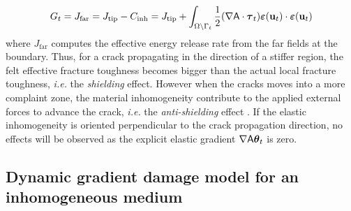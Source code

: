 \[
G_t=J_\mathrm{far}=J_\mathrm{tip}-C_\mathrm{inh}=J_\mathrm{tip}+\int_\domaint\frac{1}{2}(\nabla\tens{A}\cdot\vtau_t)\eps(\vec{u}_t)\cdot\eps(\vec{u}_t)
\]
where $J_\mathrm{far}$ computes the effective energy release rate from the far fields at the boundary. Thus, for a crack propagating in the direction of a stiffer region, the felt effective fracture toughness becomes bigger than the actual local fracture toughness, \emph{i.e.} the \emph{shielding} effect. However when the cracks moves into a more complaint zone, the material inhomogeneity contribute to the applied external forces to advance the crack, \emph{i.e.} the \emph{anti-shielding} effect \cite{KolednikPredanShanSimhaFischer:2005}. If the elastic inhomogeneity is oriented perpendicular to the crack propagation direction, no effects will be observed as the explicit elastic gradient $\nabla\tens{A}\vtheta_t$ is zero.

\subsection{Dynamic gradient damage model for an inhomogeneous medium} \label{sec:graddama}
